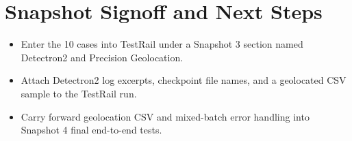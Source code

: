 \documentclass[11pt,landscape]{article}
\begin{document}
\section*{Snapshot Signoff and Next Steps}
\begin{itemize}[leftmargin=*]
\item Enter the 10 cases into TestRail under a Snapshot 3 section named Detectron2 and Precision Geolocation.
\item Attach Detectron2 log excerpts, checkpoint file names, and a geolocated CSV sample to the TestRail run.
\item Carry forward geolocation CSV and mixed-batch error handling into Snapshot 4 final end-to-end tests.
\end{itemize}
\end{document}
